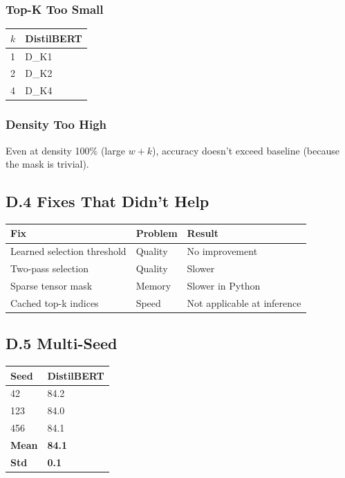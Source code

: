 \subsubsection{Top-K Too Small}

\begin{table}[H]
\centering
\small
\begin{tabular}{ll}
\toprule
\textbf{$k$} & \textbf{DistilBERT} \\
\midrule
1 & {{D\_K1}} \\
2 & {{D\_K2}} \\
4 & {{D\_K4}} \\
\bottomrule
\end{tabular}
\end{table}

\subsubsection{Density Too High}

Even at density 100\% (large $w + k$), accuracy doesn't exceed baseline 
(because the mask is trivial).

\subsection{D.4 Fixes That Didn't Help}

\begin{table}[H]
\centering
\small
\begin{tabular}{lll}
\toprule
\textbf{Fix} & \textbf{Problem} & \textbf{Result} \\
\midrule
Learned selection threshold & Quality & No improvement \\
Two-pass selection & Quality & Slower \\
Sparse tensor mask & Memory & Slower in Python \\
Cached top-k indices & Speed & Not applicable at inference \\
\bottomrule
\end{tabular}
\end{table}

\subsection{D.5 Multi-Seed}

\begin{table}[H]
\centering
\small
\begin{tabular}{ll}
\toprule
\textbf{Seed} & \textbf{DistilBERT} \\
\midrule
42 & 84.2 \\
123 & 84.0 \\
456 & 84.1 \\
\textbf{Mean} & \textbf{84.1} \\
\textbf{Std} & \textbf{0.1} \\
\bottomrule
\end{tabular}
\end{table}

